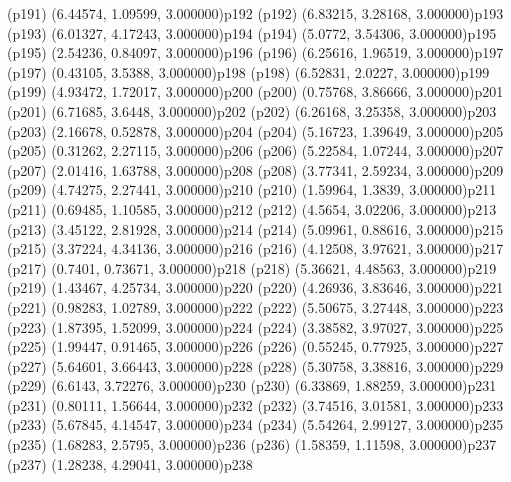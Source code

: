\psdot(p191)
\psPoint(6.44574, 1.09599, 3.000000){p192}
\psdot(p192)
\psPoint(6.83215, 3.28168, 3.000000){p193}
\psdot(p193)
\psPoint(6.01327, 4.17243, 3.000000){p194}
\psdot(p194)
\psPoint(5.0772, 3.54306, 3.000000){p195}
\psdot(p195)
\psPoint(2.54236, 0.84097, 3.000000){p196}
\psdot(p196)
\psPoint(6.25616, 1.96519, 3.000000){p197}
\psdot(p197)
\psPoint(0.43105, 3.5388, 3.000000){p198}
\psdot(p198)
\psPoint(6.52831, 2.0227, 3.000000){p199}
\psdot(p199)
\psPoint(4.93472, 1.72017, 3.000000){p200}
\psdot(p200)
\psPoint(0.75768, 3.86666, 3.000000){p201}
\psdot(p201)
\psPoint(6.71685, 3.6448, 3.000000){p202}
\psdot(p202)
\psPoint(6.26168, 3.25358, 3.000000){p203}
\psdot(p203)
\psPoint(2.16678, 0.52878, 3.000000){p204}
\psdot(p204)
\psPoint(5.16723, 1.39649, 3.000000){p205}
\psdot(p205)
\psPoint(0.31262, 2.27115, 3.000000){p206}
\psdot(p206)
\psPoint(5.22584, 1.07244, 3.000000){p207}
\psdot(p207)
\psPoint(2.01416, 1.63788, 3.000000){p208}
\psdot(p208)
\psPoint(3.77341, 2.59234, 3.000000){p209}
\psdot(p209)
\psPoint(4.74275, 2.27441, 3.000000){p210}
\psdot(p210)
\psPoint(1.59964, 1.3839, 3.000000){p211}
\psdot(p211)
\psPoint(0.69485, 1.10585, 3.000000){p212}
\psdot(p212)
\psPoint(4.5654, 3.02206, 3.000000){p213}
\psdot(p213)
\psPoint(3.45122, 2.81928, 3.000000){p214}
\psdot(p214)
\psPoint(5.09961, 0.88616, 3.000000){p215}
\psdot(p215)
\psPoint(3.37224, 4.34136, 3.000000){p216}
\psdot(p216)
\psPoint(4.12508, 3.97621, 3.000000){p217}
\psdot(p217)
\psPoint(0.7401, 0.73671, 3.000000){p218}
\psdot(p218)
\psPoint(5.36621, 4.48563, 3.000000){p219}
\psdot(p219)
\psPoint(1.43467, 4.25734, 3.000000){p220}
\psdot(p220)
\psPoint(4.26936, 3.83646, 3.000000){p221}
\psdot(p221)
\psPoint(0.98283, 1.02789, 3.000000){p222}
\psdot(p222)
\psPoint(5.50675, 3.27448, 3.000000){p223}
\psdot(p223)
\psPoint(1.87395, 1.52099, 3.000000){p224}
\psdot(p224)
\psPoint(3.38582, 3.97027, 3.000000){p225}
\psdot(p225)
\psPoint(1.99447, 0.91465, 3.000000){p226}
\psdot(p226)
\psPoint(0.55245, 0.77925, 3.000000){p227}
\psdot(p227)
\psPoint(5.64601, 3.66443, 3.000000){p228}
\psdot(p228)
\psPoint(5.30758, 3.38816, 3.000000){p229}
\psdot(p229)
\psPoint(6.6143, 3.72276, 3.000000){p230}
\psdot(p230)
\psPoint(6.33869, 1.88259, 3.000000){p231}
\psdot(p231)
\psPoint(0.80111, 1.56644, 3.000000){p232}
\psdot(p232)
\psPoint(3.74516, 3.01581, 3.000000){p233}
\psdot(p233)
\psPoint(5.67845, 4.14547, 3.000000){p234}
\psdot(p234)
\psPoint(5.54264, 2.99127, 3.000000){p235}
\psdot(p235)
\psPoint(1.68283, 2.5795, 3.000000){p236}
\psdot(p236)
\psPoint(1.58359, 1.11598, 3.000000){p237}
\psdot(p237)
\psPoint(1.28238, 4.29041, 3.000000){p238}

